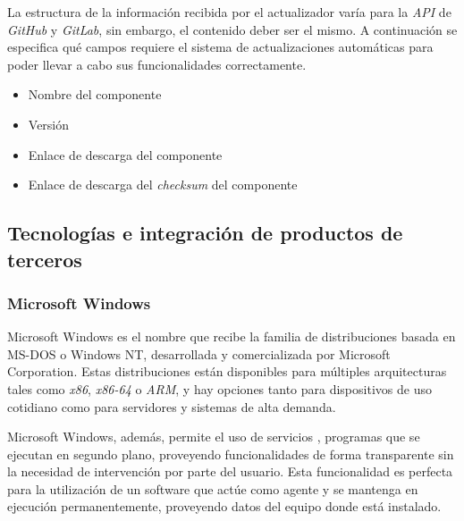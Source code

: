             La estructura de la información recibida por el actualizador varía para la \textit{API} de \textit{GitHub} y \textit{GitLab}, sin embargo, el contenido deber ser el mismo. A continuación se especifica qué campos requiere el sistema de actualizaciones automáticas para poder llevar a cabo sus funcionalidades correctamente.
            
            \begin{itemize}
                \item Nombre del componente
                \item Versión
                \item Enlace de descarga del componente
                \item Enlace de descarga del \textit{checksum} del componente
            \end{itemize}{}

    \subsection{Tecnologías e integración de productos de terceros}
        \subsubsection{Microsoft Windows}
            Microsoft Windows es el nombre que recibe la familia de distribuciones basada en MS-DOS o Windows NT, desarrollada y comercializada por Microsoft Corporation. Estas distribuciones están disponibles para múltiples arquitecturas tales como \textit{x86}, \textit{x86-64} o \textit{ARM}, y hay opciones tanto para dispositivos de uso cotidiano como para servidores y sistemas de alta demanda. \cite{wikiwindows}
            
            Microsoft Windows, además, permite el uso de servicios \cite{wikiservicios}, programas que se ejecutan en segundo plano, proveyendo funcionalidades de forma transparente sin la necesidad de intervención por parte del usuario. Esta funcionalidad es perfecta para la utilización de un software que actúe como agente y se mantenga en ejecución permanentemente, proveyendo datos del equipo donde está instalado.
            
